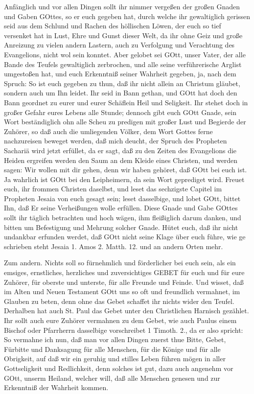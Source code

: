 Anfänglich und vor allen Dingen sollt ihr nimmer vergeßen der großen Gnaden und Gaben GOttes, so er euch gegeben hat, durch welche ihr gewaltiglich gerissen seid aus dem Schlund und Rachen des höllischen Löwen, der euch so tief versenket hat in Lust, Ehre und Gunst dieser Welt, da ihr ohne Geiz und große Anreizung zu vielen andern Lastern, auch zu Verfolgung und Verachtung des Evangelions, nicht wol sein konntet. Aber gelobet sei GOtt, unser Vater, der alle Bande des Teufels gewaltiglich zerbrochen, und alle seine verführerische Arglist umgestoßen hat, und euch Erkenntniß seiner Wahrheit gegeben, ja, nach dem Spruch: So ist euch gegeben zu thun, daß ihr nicht allein an Christum gläubet, sondern auch um Ihn leidet. Ihr seid in Bann gethan, und GOtt hat doch den Bann geordnet zu eurer und eurer Schäflein Heil und Seligkeit. Ihr stehet doch in großer Gefahr eures Lebens alle Stunde; dennoch gibt euch GOtt Gnade, sein Wort beständiglich ohn alle Scheu zu predigen mit großer Lust und Begierde der Zuhörer, so daß auch die umliegenden Völker, dem Wort Gottes ferne nachzureisen beweget werden, daß mich deucht, der Spruch des Propheten Sachariä wird jetzt erfüllet, da er sagt, daß zu den Zeiten des Evangelions die Heiden ergreifen werden den Saum an dem Kleide eines Christen, und werden sagen: Wir wollen mit dir gehen, denn wir haben gehöret, daß GOtt bei euch ist. Ja wahrlich ist GOtt bei den Leipheimern, da sein Wort geprediget wird. Freuet euch, ihr frommen Christen daselbst, und leset das sechzigste Capitel im Propheten Jesaia von euch gesagt sein; leset dasselbige, und lobet GOtt, bittet Ihn, daß Er seine Verheißungen wolle erfüllen. Diese Gnade und Gabe GOttes sollt ihr täglich betrachten und hoch wägen, ihm fleißiglich darum danken, und bitten um Befestigung und Mehrung solcher Gnade. Hütet euch, daß ihr nicht undankbar erfunden werdet, daß GOtt nicht seine Klage über euch führe, wie ge%
schrieben steht Jesaia 1. Amos 2. Matth. 12. und an andern Orten mehr.

Zum andern. Nichts soll so fürnehmlich und förderlicher bei euch sein, als ein emsiges, ernstliches, herzliches und zuversichtiges GEBET für euch und für eure Zuhörer, für oberste und unterste, für alle Freunde und Feinde. Und wisset, daß im Alten und Neuen Testament GOtt uns so oft und freundlich vermahnet, im Glauben zu beten, denn ohne das Gebet schaffet ihr nichts wider den Teufel. Derhalben hat auch St. Paul das Gebet unter den Christlichen Harnisch gezählet. Ihr sollt auch eure Zuhörer vermahnen zu dem Gebet, wie auch Paulus einem Bischof oder Pfarrherrn dasselbige vorschreibet 1 Timoth. 2., da er also spricht: So vermahne ich nun, daß man vor allen Dingen zuerst thue Bitte, Gebet, Fürbitte und Danksagung für alle Menschen, für die Könige und für alle Obrigkeit, auf daß wir ein geruhig und stilles Leben führen mögen in aller Gottseligkeit und Redlichkeit, denn solches ist gut, dazu auch angenehm vor GOtt, unserm Heiland, welcher will, daß alle Menschen genesen und zur Erkenntniß der Wahrheit kommen.

